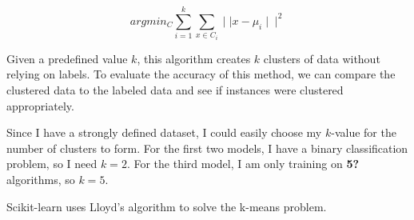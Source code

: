 \begin{equation}
argmin_C \sum_{i=1}^k \sum_{x\in C_i} \mid \mid  x-\mu_i \mid \mid ^2\label{kmeans}
\end{equation}

Given a predefined value $k$, this algorithm creates $k$ clusters of data without relying on labels.  To evaluate the accuracy of this method, we can compare the clustered data to the labeled data and see if instances were clustered appropriately.


Since I have a strongly defined dataset, I could easily choose my $k$-value for the number of clusters to form.  For the first two models, I have a binary classification problem, so I need $k=2$.  For the third model, I am only training on \textbf{5?} algorithms, so $k=5$.

Scikit-learn uses Lloyd's algorithm \cite{lloyd} to solve the k-means problem.


